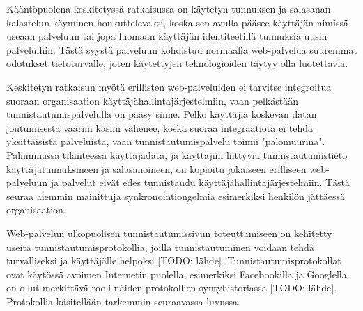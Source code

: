Kääntöpuolena keskitetyssä ratkaisussa on käytetyn tunnuksen ja salasanan kalastelun käyminen houkuttelevaksi, koska sen avulla pääsee käyttäjän nimissä useaan palveluun tai jopa luomaan käyttäjän identiteetillä tunnuksia uusin palveluihin. Tästä syystä palveluun kohdistuu normaalia web-palvelua suuremmat odotukset tietoturvalle, joten käytettyjen teknologioiden täytyy olla luotettavia.

Keskitetyn ratkaisun myötä erillisten web-palveluiden ei tarvitse integroitua suoraan organisaation käyttäjähallintajärjestelmiin, vaan pelkästään tunnistautumispalvelulla on pääsy sinne. Pelko käyttäjiä koskevan datan joutumisesta vääriin käsiin vähenee, koska suoraa integraatiota ei tehdä yksittäisistä palveluista, vaan tunnistautumispalvelu toimii "palomuurina". Pahimmassa tilanteessa käyttäjädata, ja käyttäjiin liittyviä tunnistautumistieto käyttäjätunnuksineen ja salasanoineen, on kopioitu jokaiseen erilliseen web-palveluun ja palvelut eivät edes tunnistaudu käyttäjähallintajärjestelmiin. Tästä seuraa aiemmin mainittuja synkronointiongelmia esimerkiksi henkilön jättäessä organisaation.

Web-palvelun ulkopuolisen tunnistautumissivun toteuttamiseen on kehitetty useita tunnistautumisprotokollia, joilla tunnistautuminen voidaan tehdä turvalliseksi ja käyttäjälle helpoksi [TODO: lähde]. Tunnistautumisprotokollat ovat käytössä avoimen Internetin puolella, esimerkiksi Facebookilla ja Googlella on ollut merkittävä rooli näiden protokollien syntyhistoriassa [TODO: lähde]. Protokollia käsitellään tarkemmin seuraavassa luvussa.